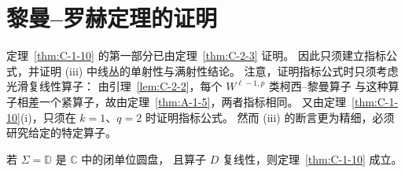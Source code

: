 
\section{黎曼--罗赫定理的证明}\label{sec:C-4}

定理~\ref{thm:C-1-10} 的第一部分已由定理~\ref{thm:C-2-3} 证明。
因此只须建立指标公式，并证明 (iii) 中线丛的单射性与满射性结论。
注意，证明指标公式时只须考虑光滑复线性算子：
由引理~\ref{lem:C-2-2}，每个 $W^{\ell-1,p}$ 类柯西--黎曼算子
与这种算子相差一个紧算子，故由定理~\ref{thm:A-1-5}，两者指标相同。
又由定理~\ref{thm:C-1-10}(i)，只须在 $k=1$、$q=2$ 时证明指标公式。
然而 (iii) 的断言更为精细，必须研究给定的特定算子。

\begin{theorem}\label{thm:C-4-1}
若 $\Sigma=\mathbb D$ 是 $\mathbb C$ 中的闭单位圆盘，
且算子 $D$ 复线性，则定理~\ref{thm:C-1-10} 成立。
\end{theorem}

